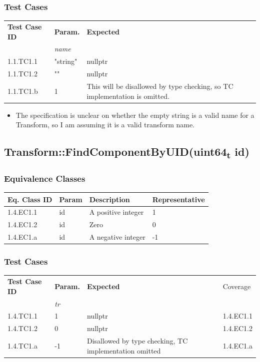\documentclass[11pt]{article}
\begin{document}
\subsubsection*{Test Cases}
\label{sec:orgf16f02d}
\begin{center}
\begin{tabularx}{\textwidth}{lXXX}
\hline
\textbf{Test Case ID} & \textbf{Param.} & \textbf{Expected}\\
 & \textit{name} & \\
\hline
1.1.TC1.1 & "string" & nullptr\\
\hline
1.1.TC1.2 & "" & nullptr\\
\hline
1.1.TC1.b & 1 & This will be disallowed by type checking, so TC implementation is omitted.\\
\hline
\end{tabularx}
\end{center}

\begin{itemize}
\item The specification is unclear on whether the empty string is a valid name for a Transform, so I am assuming it is a valid transform name.
\end{itemize}
\subsection{Transform::FindComponentByUID(uint64\textsubscript{t} id)}
\label{sec:org2d04288}

\subsubsection*{Equivalence Classes}
\label{sec:orgcd78968}
\begin{center}
\begin{tabularx}{\textwidth}{lXXX}
\hline
\textbf{Eq. Class ID} & \textbf{Param} & \textbf{Description} & \textbf{Representative}\\
\hline
1.4.EC1.1 & id & A positive integer & 1\\
\hline
1.4.EC1.2 & id & Zero & 0\\
\hline
1.4.EC1.a & id & A negative integer & -1\\
\hline
\end{tabularx}
\end{center}
\subsubsection*{Test Cases}
\label{sec:org4e090db}
\begin{center}
\begin{tabularx}{\textwidth}{lXXX}
\hline
\textbf{Test Case ID} & \textbf{Param.} & \textbf{Expected} & Coverage\\
 & \textit{tr} &  & \\
\hline
1.4.TC1.1 & 1 & nullptr & 1.4.EC1.1\\
\hline
1.4.TC1.2 & 0 & nullptr & 1.4.EC1.2\\
\hline
1.4.TC1.a & -1 & Disallowed by type checking, TC implementation omitted & 1.4.EC1.a\\
\hline
\end{tabularx}
\end{center}
\end{document}
